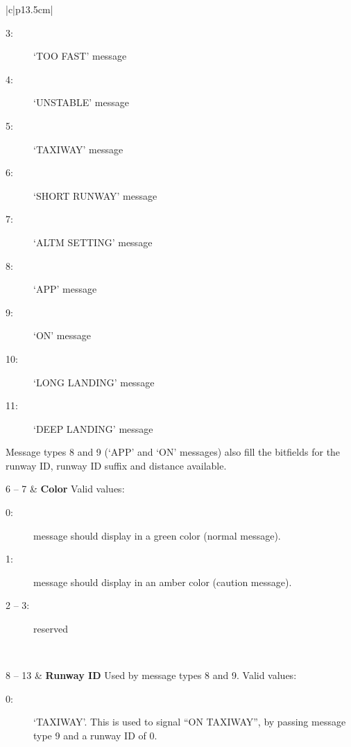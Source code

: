 \documentclass[a4paper,12pt]{article}
\begin{document}
\begin{appendix}
{\begin{center}
\begin{supertabular}{|c|p{13.5cm}|}
\begin{description}
\item[3:] `TOO FAST' message

\item[4:] `UNSTABLE' message

\item[5:] `TAXIWAY' message

\item[6:] `SHORT RUNWAY' message

\item[7:] `ALTM SETTING' message

\item[8:] `APP' message

\item[9:] `ON' message

\item[10:] `LONG LANDING' message

\item[11:] `DEEP LANDING' message

\end{description}

Message types 8 and 9 (`APP' and `ON' messages) also fill the bitfields
for the runway ID, runway ID suffix and distance available. \\

\hline

6 -- 7 &
\textbf{Color}\newline
Valid values:

\begin{description}

\item[0:] message should display in a green color (normal message).

\item[1:] message should display in an amber color (caution message).

\item[2 -- 3:] reserved

\end{description} \\

\hline

8 -- 13 &
\textbf{Runway ID}\newline
Used by message types 8 and 9. Valid values:

\begin{description}

\item[0:] `TAXIWAY'. This is used to signal ``ON TAXIWAY'', by passing
message type 9 and a runway ID of 0.


\end{description}
\end{supertabular}
\end{center}}
\end{appendix}
\end{document}
